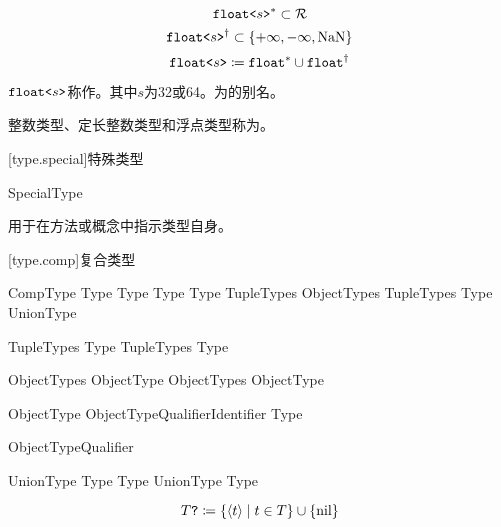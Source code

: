 $$ \texttt{float<}s\texttt{>}^\ast \subset \mathcal{R} $$
$$ \texttt{float<}s\texttt{>}^\dagger \subset \{ +\infty, -\infty, \mathrm{NaN} \} $$
$$ \texttt{float<}s\texttt{>} \coloneqq \texttt{float}^\ast \cup \texttt{float}^\dagger $$

\pnum
$\texttt{float<}s\texttt{>}$称作。其中$s$为32或64。为的别名。

\pnum
整数类型、定长整数类型和浮点类型称为。

[type.special]{特殊类型}

\begin{bnf}{SpecialType}
\end{bnf}

\pnum
{}用于在方法或概念中指示类型自身。

[type.comp]{复合类型}

\begin{bnf}{CompType}
    Type  \br
    Type \terminal{[} \terminal{]} \br
    Type \terminal{[} Type \terminal{]} \br
    \terminal{(} TupleTypes\bnfs \terminal{)} \br
    \terminal{\{} ObjectTypes \terminal{\}} \br
    \terminal{(} TupleTypes\bnfs \terminal{)} \terminal{->} Type \br
    UnionType
\end{bnf}

\begin{bnf}{TupleTypes}
    Type \br
    TupleTypes \terminal{,} Type
\end{bnf}

\begin{bnf}{ObjectTypes}
    ObjectType \br
    ObjectTypes \terminal{,} ObjectType
\end{bnf}

\begin{bnf}{ObjectType}
    ObjectTypeQualifier\bnfs Identifier \terminal{:} Type
\end{bnf}

\begin{bnf}{ObjectTypeQualifier}
     \br
\end{bnf}

\begin{bnf}{UnionType}
    Type \terminal{|} Type \br
    UnionType \terminal{|} Type
\end{bnf}

$$ T\texttt{?} \coloneqq \{ \langle t \rangle \mid t \in T \} \cup \{ \mathrm{nil} \} $$

